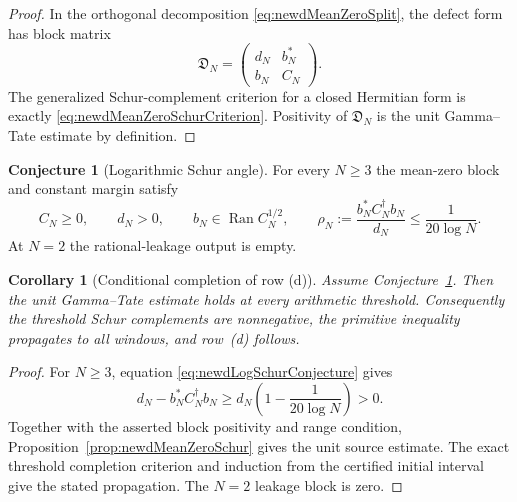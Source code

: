\documentclass[11pt]{amsart}
\newtheorem{corollary}[theorem]{Corollary}
\theoremstyle{definition}
\newtheorem{conjecture}[theorem]{Conjecture}
\theoremstyle{remark}
\begin{document}
\begin{proof}
In the orthogonal decomposition \eqref{eq:newdMeanZeroSplit}, the defect
form has block matrix
\[
 \mathfrak D_N=
 \begin{pmatrix}d_N&b_N^*\\ b_N&C_N\end{pmatrix}.
\]
The generalized Schur-complement criterion for a closed Hermitian form is
exactly \eqref{eq:newdMeanZeroSchurCriterion}.  Positivity of
$\mathfrak D_N$ is the unit Gamma--Tate estimate by definition.
\end{proof}

\begin{conjecture}[Logarithmic Schur angle]
\label{conj:newdLogSchurAngle}
For every $N\geq3$ the mean-zero block and constant margin satisfy
\begin{equation}\label{eq:newdLogSchurConjecture}
 C_N\geq0,
 \qquad d_N>0,
 \qquad b_N\in\operatorname{Ran}C_N^{1/2},
 \qquad
 \rho_N:=\frac{b_N^*C_N^\dagger b_N}{d_N}
 \leq\frac1{20\log N}.
\end{equation}
At $N=2$ the rational-leakage output is empty.
\end{conjecture}

\begin{corollary}[Conditional completion of row (d)]
\label{cor:newdConditionalRowD}
Assume Conjecture~\ref{conj:newdLogSchurAngle}.  Then the unit Gamma--Tate
estimate holds at every arithmetic threshold.  Consequently the threshold
Schur complements are nonnegative, the primitive inequality propagates to
all windows, and row~(d) follows.
\end{corollary}

\begin{proof}
For $N\geq3$, equation \eqref{eq:newdLogSchurConjecture} gives
\[
 d_N-b_N^*C_N^\dagger b_N
 \geq d_N\left(1-\frac1{20\log N}\right)>0.
\]
Together with the asserted block positivity and range condition,
Proposition~\ref{prop:newdMeanZeroSchur} gives the unit source estimate.
The exact threshold completion criterion and induction from the certified
initial interval give the stated propagation.  The $N=2$ leakage block is
zero.
\end{proof}
\end{document}
